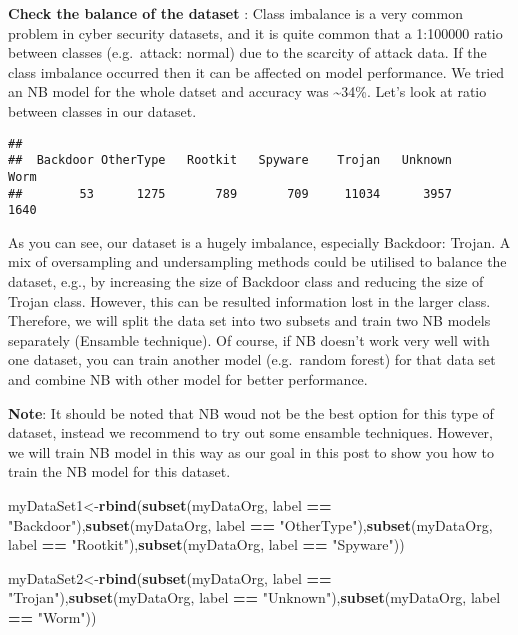 \documentclass[]{article}
\newenvironment{Shaded}{\begin{snugshade}}{\end{snugshade}}
\newcommand{\KeywordTok}[1]{\textcolor[rgb]{0.13,0.29,0.53}{\textbf{#1}}}
\newcommand{\NormalTok}[1]{#1}
\newcommand{\OperatorTok}[1]{\textcolor[rgb]{0.81,0.36,0.00}{\textbf{#1}}}
\newcommand{\StringTok}[1]{\textcolor[rgb]{0.31,0.60,0.02}{#1}}
\begin{document}
\textbf{Check the balance of the dataset} : Class imbalance is a very
common problem in cyber security datasets, and it is quite common that a
1:100000 ratio between classes (e.g.~attack: normal) due to the scarcity
of attack data. If the class imbalance occurred then it can be affected
on model performance. We tried an NB model for the whole datset and
accuracy was \textasciitilde{}34\%. Let's look at ratio between classes
in our dataset.

\begin{Shaded}
\end{Shaded}

\begin{verbatim}
## 
##  Backdoor OtherType   Rootkit   Spyware    Trojan   Unknown      Worm 
##        53      1275       789       709     11034      3957      1640
\end{verbatim}

As you can see, our dataset is a hugely imbalance, especially Backdoor:
Trojan. A mix of oversampling and undersampling methods could be
utilised to balance the dataset, e.g., by increasing the size of
Backdoor class and reducing the size of Trojan class. However, this can
be resulted information lost in the larger class. Therefore, we will
split the data set into two subsets and train two NB models separately
(Ensamble technique). Of course, if NB doesn't work very well with one
dataset, you can train another model (e.g.~random forest) for that data
set and combine NB with other model for better performance.

\textbf{Note}: It should be noted that NB woud not be the best option
for this type of dataset, instead we recommend to try out some ensamble
techniques. However, we will train NB model in this way as our goal in
this post to show you how to train the NB model for this dataset.

\begin{Shaded}
\begin{Highlighting}[]
\NormalTok{myDataSet1<-}\KeywordTok{rbind}\NormalTok{(}\KeywordTok{subset}\NormalTok{(myDataOrg, label }\OperatorTok{==}\StringTok{ "Backdoor"}\NormalTok{),}\KeywordTok{subset}\NormalTok{(myDataOrg, label }\OperatorTok{==}\StringTok{ "OtherType"}\NormalTok{),}\KeywordTok{subset}\NormalTok{(myDataOrg, label }\OperatorTok{==}\StringTok{ "Rootkit"}\NormalTok{),}\KeywordTok{subset}\NormalTok{(myDataOrg, label }\OperatorTok{==}\StringTok{ "Spyware"}\NormalTok{))}

\NormalTok{myDataSet2<-}\KeywordTok{rbind}\NormalTok{(}\KeywordTok{subset}\NormalTok{(myDataOrg, label }\OperatorTok{==}\StringTok{ "Trojan"}\NormalTok{),}\KeywordTok{subset}\NormalTok{(myDataOrg, label }\OperatorTok{==}\StringTok{ "Unknown"}\NormalTok{),}\KeywordTok{subset}\NormalTok{(myDataOrg, label }\OperatorTok{==}\StringTok{ "Worm"}\NormalTok{))}
\end{Highlighting}
\end{Shaded}
\end{document}
